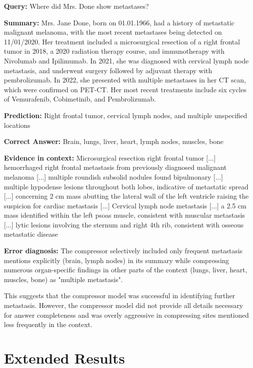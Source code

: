 \documentclass{article} %
\begin{document}
\begin{exampleboxmaroon}
\textbf{Query:} Where did Mrs. Done show metastases?

\textbf{Summary:} Mrs. Jane Done, born on 01.01.1966, had a history of metastatic malignant melanoma, with the most recent metastases being detected on 11/01/2020. Her treatment included a microsurgical resection of a right frontal tumor in 2018, a 2020 radiation therapy course, and immunotherapy with Nivolumab and Ipilimumab. In 2021, she was diagnosed with cervical lymph node metastasis, and underwent surgery followed by adjuvant therapy with pembrolizumab. In 2022, she presented with multiple metastases in her CT scan, which were confirmed on PET-CT. Her most recent treatments include six cycles of Vemurafenib, Cobimetinib, and Pembrolizumab.

\textbf{Prediction:} Right frontal tumor, cervical lymph nodes, and multiple unspecified locations  

\textbf{Correct Answer:} Brain, lungs, liver, heart, lymph nodes, muscles, bone  

\textbf{Evidence in context:} Microsurgical resection right frontal tumor [...] hemorrhaged right frontal metastasis from previously diagnosed malignant melanoma [...] multiple roundish subsolid nodules found bipulmonary [...] multiple hypodense lesions throughout both lobes, indicative of metastatic spread [...] concerning 2 cm mass abutting the lateral wall of the left ventricle raising the suspicion for cardiac metastasis [...] Cervical lymph node metastasis [...] a 2.5 cm mass identified within the left psoas muscle, consistent with muscular metastasis [...] lytic lesions involving the sternum and right 4th rib, consistent with osseous metastatic disease

\textbf{Error diagnosis:} The compressor selectively included only frequent metastasis mentions explicitly (brain, lymph nodes) in its summary while compressing numerous organ-specific findings in other parts of the context (lungs, liver, heart, muscles, bone) as "multiple metastasis".  

This suggests that the compressor model was successful in identifying further metastasis. However, the compressor model did not provide all details necessary for answer completeness and was overly aggressive in compressing sites mentioned less frequently in the context.
\end{exampleboxmaroon}

\section{Extended Results}
\end{document}

